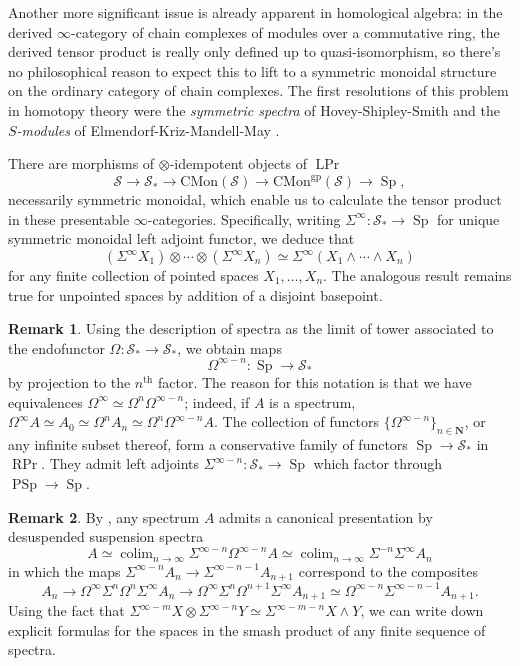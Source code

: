 \documentclass[12pt]{article}
\theoremstyle{definition}
\newtheorem{remark}{Remark}[subsection]
\renewcommand{\S}{\mathcal{S}}
\newcommand{\NN}{\mathbf{N}}
\renewcommand{\i}{\infty}
\newcommand{\too}{\longrightarrow}
\DeclareMathOperator{\colim}{colim}
\DeclareMathOperator{\Prl}{LPr}
\DeclareMathOperator{\PrR}{RPr}
\DeclareMathOperator{\PSp}{PSp}
\DeclareMathOperator{\Sp}{Sp}
\newcommand{\CMon}{\mathrm{CMon}}
\begin{document}
Another more significant issue is already apparent in homological algebra: in the derived $\i$-category of chain complexes of modules over a commutative ring, the derived tensor product is really only defined up to quasi-isomorphism, so there's no philosophical reason to expect this to lift to a symmetric monoidal structure on the ordinary category of chain complexes.
The first resolutions of this problem in homotopy theory were the {\em symmetric spectra} of Hovey-Shipley-Smith \cite{HSS} and the {\em $S$-modules} of Elmendorf-Kriz-Mandell-May \cite{EKMM}. 


There are morphisms of $\otimes$-idempotent objects of $\Prl$
\[
\S\too\S_*\too\CMon(\S)\too\CMon^\mathrm{gp}(\S)\too\Sp,
\]
necessarily symmetric monoidal, which enable us to calculate the tensor product in these presentable $\infty$-categories.
Specifically, writing $\Sigma^\infty:\S_*\to\Sp$\index{$\Sigma^\infty$} for unique symmetric monoidal left adjoint functor, we deduce that
\[
(\Sigma^\infty X_1)\otimes\cdots\otimes(\Sigma^\infty X_n)\simeq \Sigma^\infty(X_1\land\cdots\land X_n)
\]
for any finite collection of pointed spaces $X_1,\ldots,X_n$.
The analogous result remains true for unpointed spaces by addition of a disjoint basepoint.
\begin{remark}
Using the description of spectra as the limit of tower associated to the endofunctor $\Omega:\S_*\to\S_*$, we obtain maps
\[
\Omega^{\infty-n}:\Sp\too\S_*
\]
by projection to the $n^\mathrm{th}$ factor.
The reason for this notation is that we have equivalences $\Omega^\infty\simeq\Omega^n\Omega^{\infty-n}$; indeed, if $A$ is a spectrum, $\Omega^\infty A\simeq A_0\simeq\Omega^n A_n\simeq\Omega^n\Omega^{\infty-n}A$.
The collection of functors $\{\Omega^{\infty-n}\}_{n\in\NN}$, or any infinite subset thereof, form a conservative family of functors $\Sp\to\S_*$ in $\PrR$.
They admit left adjoints $\Sigma^{\infty-n}:\S_*\to\Sp$ which factor through $\PSp\to\Sp$.
\end{remark}
\begin{remark}
By \cite[Proposition 6.3.3.6]{HTT}, any spectrum $A$ admits a canonical presentation by desuspended suspension spectra
\[
A\simeq\colim_{n\to\infty}\Sigma^{\infty-n}\Omega^{\infty-n}A\simeq\colim_{n\to\infty}\Sigma^{-n}\Sigma^\i A_n
\]
in which the maps $\Sigma^{\infty-n} A_n\to\Sigma^{\infty-n-1} A_{n+1}$ correspond to the composites
\[
A_n\to\Omega^{\infty}\Sigma^n\Omega^n\Sigma^{\infty} A_{n}
\to\Omega^{\infty}\Sigma^n\Omega^{n+1}\Sigma^{\infty}A_{n+1}\simeq\Omega^{\infty-n}\Sigma^{\infty-n-1}A_{n+1}.
\]
Using the fact that $\Sigma^{\infty-m}X\otimes\Sigma^{\infty-n}Y\simeq\Sigma^{\infty-m-n}X\land Y$, we can write down explicit formulas for the spaces in the smash product of any finite sequence of spectra.
\end{remark}
\end{document}
